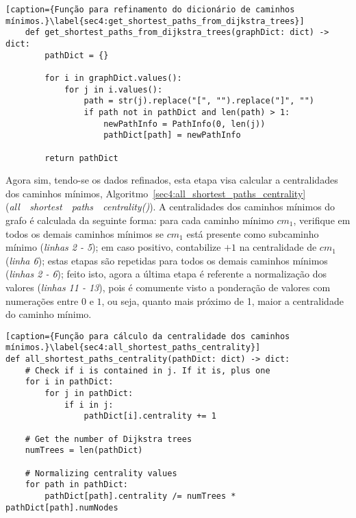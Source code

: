 \begin{lstlisting}[caption={Função para refinamento do dicionário de caminhos mínimos.}\label{sec4:get_shortest_paths_from_dijkstra_trees}]
	def get_shortest_paths_from_dijkstra_trees(graphDict: dict) -> dict:
		pathDict = {}

		for i in graphDict.values():
			for j in i.values():
				path = str(j).replace("[", "").replace("]", "")
				if path not in pathDict and len(path) > 1:
					newPathInfo = PathInfo(0, len(j))
					pathDict[path] = newPathInfo

		return pathDict
\end{lstlisting}

Agora sim, tendo-se os dados refinados, esta etapa visa calcular a centralidades dos caminhos mínimos, Algoritmo~\ref{sec4:all_shortest_paths_centrality} (\mbox{\emph{all~\textunderscore~shortest~\textunderscore~paths~\textunderscore~centrality()}}). A centralidades dos caminhos mínimos do grafo é calculada da seguinte forma: para cada caminho mínimo $cm_1$, verifique em todos os demais caminhos mínimos se $cm_1$ está presente como subcaminho mínimo (\emph{linhas 2 - 5}); em caso positivo, contabilize $+1$ na centralidade de $cm_1$ (\emph{linha 6}); estas etapas são repetidas para todos os demais caminhos mínimos (\emph{linhas 2 - 6}); feito isto, agora a última etapa é referente a normalização dos valores (\emph{linhas 11 - 13}), pois é comumente visto a ponderação de valores com numerações entre $0$ e $1$, ou seja, quanto mais próximo de 1, maior a centralidade do caminho mínimo.

\begin{lstlisting}[caption={Função para cálculo da centralidade dos caminhos mínimos.}\label{sec4:all_shortest_paths_centrality}]
def all_shortest_paths_centrality(pathDict: dict) -> dict:
	# Check if i is contained in j. If it is, plus one
	for i in pathDict:
		for j in pathDict:
			if i in j:
				pathDict[i].centrality += 1

	# Get the number of Dijkstra trees
	numTrees = len(pathDict)

	# Normalizing centrality values
	for path in pathDict:
		pathDict[path].centrality /= numTrees * pathDict[path].numNodes
\end{lstlisting}

